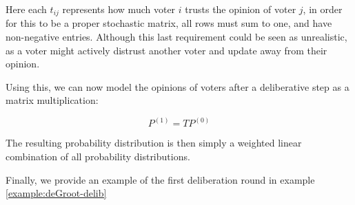 Here each $t_{ij}$ represents how much voter $i$ trusts the opinion of voter $j$, in order for this to be a proper stochastic matrix, all rows must sum to one, and have non-negative entries. Although this last requirement could be seen as unrealistic, as a voter might actively distrust another voter and update away from their opinion.

Using this, we can now model the opinions of voters after a deliberative step as a matrix multiplication:

\begin{equation}
	P^{(1)} = TP^{(0)}
	\label{eq:update_degroot}
\end{equation}

The resulting probability distribution is then simply a weighted linear combination of all probability distributions.

Finally, we provide an example of the first deliberation round in example \ref{example:deGroot-delib}

